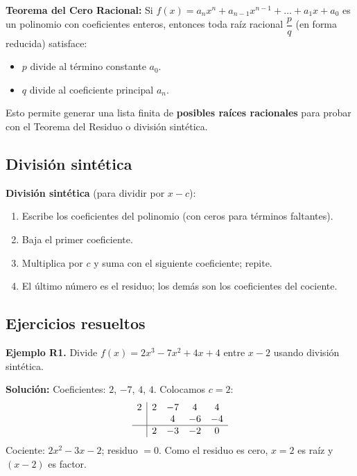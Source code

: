 \documentclass[12pt, letterpaper]{article}
\begin{document}
\begin{cuadroextra}
  \textbf{Teorema del Cero Racional:} Si $f(x) = a_n x^n + a_{n-1}x^{n-1} + \dots + a_1 x + a_0$ es un polinomio con coeficientes enteros, entonces toda raíz racional $\dfrac{p}{q}$ (en forma reducida) satisface:
  \begin{itemize}[leftmargin=*]
    \item $p$ divide al término constante $a_0$.
    \item $q$ divide al coeficiente principal $a_n$.
  \end{itemize}
  Esto permite generar una lista finita de \textbf{posibles raíces racionales} para probar con el Teorema del Residuo o división sintética.
\end{cuadroextra}

\subsection{División sintética}

\begin{cuadroadvertencia}
  \textbf{División sintética} (para dividir por $x - c$):
  \begin{enumerate}[leftmargin=*]
    \item Escribe los coeficientes del polinomio (con ceros para términos faltantes).
    \item Baja el primer coeficiente.
    \item Multiplica por $c$ y suma con el siguiente coeficiente; repite.
    \item El último número es el residuo; los demás son los coeficientes del cociente.
  \end{enumerate}
\end{cuadroadvertencia}

\subsection{Ejercicios resueltos}

\textbf{Ejemplo R1.} Divide $f(x) = 2x^3 - 7x^2 + 4x + 4$ entre $x - 2$ usando división sintética.

\begin{cuadrosolucion}
  \textbf{Solución:} Coeficientes: $2$, $-7$, $4$, $4$. Colocamos $c = 2$:
  \[
    \begin{array}{c|cccc}
      2 & 2 & -7 & 4  & 4  \\
        &   & 4  & -6 & -4 \\
      \hline
        & 2 & -3 & -2 & 0  \\
    \end{array}
  \]
  Cociente: $2x^2 - 3x - 2$; residuo $= 0$. Como el residuo es cero, $x = 2$ es raíz y $(x - 2)$ es factor.
\end{cuadrosolucion}
\end{document}
